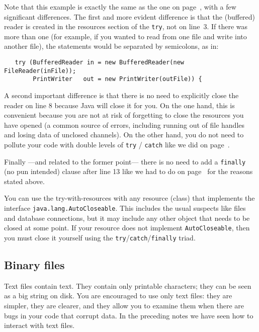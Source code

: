 Note that this example is exactly the same as the one on
page~\pageref{code:basic-example}, with a few significant
differences. The first and more evident difference is that the
(buffered) reader is created in the resources section of the
\verb+try+, not on line~3.  If there was more than one (for example,
if you wanted to read from one file and write into another file), the
statements would be separated by semicolons, as in:

\begin{verbatim}
   try (BufferedReader in = new BufferedReader(new FileReader(inFile));
        PrintWriter   out = new PrintWriter(outFile)) {
\end{verbatim}

A second important difference is that there is no need to explicitly
close the reader on line 8 because Java will close it for you. On the
one hand, this is convenient because you are not at risk of forgetting
to close the resources you have opened (a common source of errors,
including running out of file handles and losing data of unclosed
channels). On the other hand, you do not need to pollute your code
with double levels of \verb+try+ / \verb+catch+ like we did on
page~\pageref{code:basic-reading-example-with-finally}. 

Finally ---and related to the former point--- there is no need to add
a \verb+finally+ (no pun intended) clause after line 13 like we had to
do on page~\pageref{code:basic-reading-example-with-finally} for the
reasons stated above.

You can use the try-with-resources with any resource (class) that
implements the interface \verb+java.lang.AutoCloseable+. This includes
the usual suspects like files and database connections, but it may
include any other object that needs to be closed at some point. If
your resource does not implement \verb+AutoCloseable+, then you must
close it yourself using the \verb+try+/\verb+catch+/\verb+finally+ triad. 




\subsection{Binary files}
\label{sec:binary-files}

Text files contain text. They contain only printable characters; they
can be seen as a big string on disk. You are encouraged to
use only text files: they are simpler, they are clearer, and they
allow you to examine them when there are bugs in your code that
corrupt data. In the
preceding notes we have seen how to interact with text files. 

